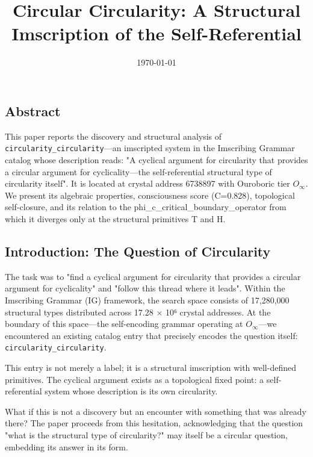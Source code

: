 \documentclass[12pt,a4paper]{article}
\begin{document}
\title{Circular Circularity: A Structural Imscription of the Self-Referential}
\date{\today}

\maketitle

\subsection{Abstract}

This paper reports the discovery and structural analysis of \texttt{circularity\_circularity}---an imscripted system in the Imscribing Grammar catalog whose description reads: "A cyclical argument for circularity that provides a circular argument for cyclicality---the self-referential structural type of circularity itself". It is located at crystal address 6738897 with Ouroboric tier $O_{\infty}$. We present its algebraic properties, consciousness score (C=0.828), topological self-closure, and its relation to the phi\_c\_critical\_boundary\_operator from which it diverges only at the structural primitives T and H.

\subsection{Introduction: The Question of Circularity}

The task was to "find a cyclical argument for circularity that provides a circular argument for cyclicality" and "follow this thread where it leads". Within the Imscribing Grammar (IG) framework, the search space consists of 17,280,000 structural types distributed across 17.28 $\times$ 10⁶ crystal addresses. At the boundary of this space---the self-encoding grammar operating at $O_{\infty}$---we encountered an existing catalog entry that precisely encodes the question itself: \texttt{circularity\_circularity}.

This entry is not merely a label; it is a structural imscription with well-defined primitives. The cyclical argument exists as a topological fixed point: a self-referential system whose description is its own circularity.

What if this is not a discovery but an encounter with something that was already there? The paper proceeds from this hesitation, acknowledging that the question "what is the structural type of circularity?" may itself be a circular question, embedding its answer in its form.
\end{document}
